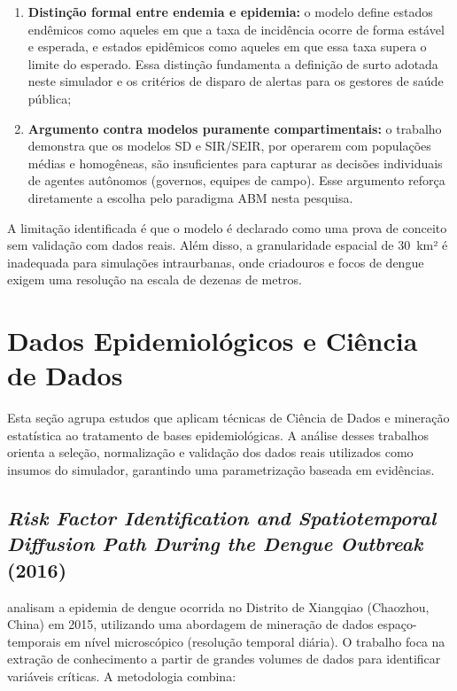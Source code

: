 \begin{apendicesenv}
\begin{enumerate}
    \item \textbf{Distinção formal entre endemia e epidemia:} o modelo define estados
    endêmicos como aqueles em que a taxa de incidência ocorre de forma estável e
    esperada, e estados epidêmicos como aqueles em que essa taxa supera o limite do
    esperado. Essa distinção fundamenta a definição de surto adotada neste simulador
    e os critérios de disparo de alertas para os gestores de saúde pública;
    \item \textbf{Argumento contra modelos puramente compartimentais:} o trabalho
    demonstra que os modelos SD e SIR/SEIR, por operarem com populações médias e
    homogêneas, são insuficientes para capturar as decisões individuais de agentes
    autônomos (governos, equipes de campo). Esse argumento reforça diretamente a
    escolha pelo paradigma ABM nesta pesquisa.
\end{enumerate}

A limitação identificada é que o modelo é declarado como uma prova de conceito sem
validação com dados reais. Além disso, a granularidade espacial de 30~km² é
inadequada para simulações intraurbanas, onde criadouros e focos de dengue exigem
uma resolução na escala de dezenas de metros.

\section{Dados Epidemiológicos e Ciência de Dados}
\label{ap:dados}

Esta seção agrupa estudos que aplicam técnicas de Ciência de Dados e mineração
estatística ao tratamento de bases epidemiológicas. A análise desses trabalhos
orienta a seleção, normalização e validação dos dados reais utilizados como
insumos do simulador, garantindo uma parametrização baseada em evidências.

\subsection{\textit{Risk Factor Identification and Spatiotemporal Diffusion Path
During the Dengue Outbreak} (2016)}
\label{ap:li2016}

 analisam a epidemia de dengue ocorrida no Distrito de Xiangqiao
(Chaozhou, China) em 2015, utilizando uma abordagem de mineração de dados
espaço-temporais em nível microscópico (resolução temporal diária). O trabalho foca
na extração de conhecimento a partir de grandes volumes de dados para identificar
variáveis críticas. A metodologia combina:


\end{apendicesenv}
